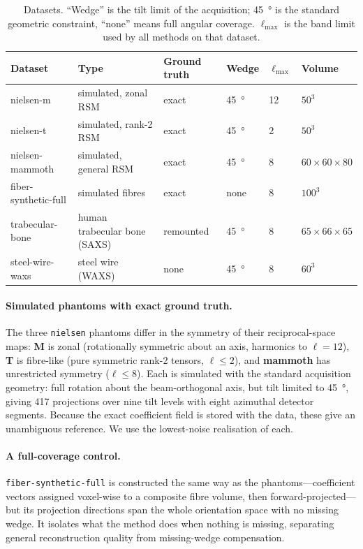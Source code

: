 \documentclass[11pt,a4paper]{article}
\newcommand{\ellmax}{\ell_{\mathrm{max}}}
\begin{document}
\begin{table}[t]
\centering
\small
\caption{Datasets. ``Wedge'' is the tilt limit of the acquisition; \SI{45}{\degree} is the
standard geometric constraint, ``none'' means full angular coverage. $\ellmax$ is the
band limit used by all methods on that dataset.}
\label{tab:datasets}
\begin{tabular}{@{}llllll@{}}
\toprule
Dataset & Type & Ground truth & Wedge & $\ellmax$ & Volume \\
\midrule
nielsen-m       & simulated, zonal RSM        & exact       & \SI{45}{\degree} & 12 & $50^3$ \\
nielsen-t       & simulated, rank-2 RSM       & exact       & \SI{45}{\degree} & 2  & $50^3$ \\
nielsen-mammoth & simulated, general RSM      & exact       & \SI{45}{\degree} & 8  & $60\times60\times80$ \\
fiber-synthetic-full & simulated fibres       & exact       & none & 8 & $100^3$ \\
trabecular-bone & human trabecular bone (SAXS)& remounted   & \SI{45}{\degree} & 8 & $65\times66\times65$ \\
steel-wire-waxs & steel wire (WAXS)           & none        & \SI{45}{\degree} & 8 & $60^3$ \\
\bottomrule
\end{tabular}
\end{table}

\paragraph{Simulated phantoms with exact ground truth.}
The three \texttt{nielsen} phantoms \citep{Nielsen2023} differ in the symmetry of their
reciprocal-space maps: \textbf{M} is zonal (rotationally symmetric about an axis, harmonics
to $\ell=12$), \textbf{T} is fibre-like (pure symmetric rank-2 tensors, $\ell\le 2$), and
\textbf{mammoth} has unrestricted symmetry ($\ell \le 8$). Each is simulated with the
standard acquisition geometry: full rotation about the beam-orthogonal axis, but tilt
limited to \SI{45}{\degree}, giving 417 projections over nine tilt levels with eight
azimuthal detector segments. Because the exact coefficient field is stored with the data,
these give an unambiguous reference. We use the lowest-noise realisation of each.

\paragraph{A full-coverage control.}
\texttt{fiber-synthetic-full} is constructed the same way as the phantoms---coefficient
vectors assigned voxel-wise to a composite fibre volume, then forward-projected---but its
projection directions span the whole orientation space with no missing wedge. It isolates
what the method does when nothing is missing, separating general reconstruction quality
from missing-wedge compensation.
\end{document}
